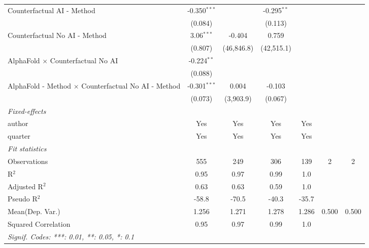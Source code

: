 \begin{tabular}{lcccccc}
   Counterfactual AI - Method                                 & -0.350$^{***}$ &              & -0.295$^{**}$ &                &     &   \\   
                                                              & (0.084)        &              & (0.113)       &                &     &   \\   
   Counterfactual No AI - Method                              & 3.06$^{***}$   & -0.404       & 0.759         &                &     &   \\   
                                                              & (0.807)        & (46,846.8)   & (42,515.1)    &                &     &   \\   
   AlphaFold $\times$ Counterfactual No AI                    & -0.224$^{**}$  &              &               &                &     &   \\   
                                                              & (0.088)        &              &               &                &     &   \\   
   AlphaFold - Method $\times$ Counterfactual No AI - Method  & -0.301$^{***}$ & 0.004        & -0.103        &                &     &   \\   
                                                              & (0.073)        & (3,903.9)    & (0.067)       &                &     &   \\   
   \midrule
   \emph{Fixed-effects}\\
   author                                                     & Yes            & Yes          & Yes           & Yes            &     & \\  
   quarter                                                    & Yes            & Yes          & Yes           & Yes            &     & \\  
   \midrule
   \emph{Fit statistics}\\
   Observations                                               & 555            & 249          & 306           & 139            & 2   & 2\\  
   R$^2$                                                      & 0.95           & 0.97         & 0.99          & 1.0            &     & \\  
   Adjusted R$^2$                                             & 0.63           & 0.63         & 0.59          & 1.0            &     & \\  
   Pseudo R$^2$                                               & -58.8          & -70.5        & -40.3         & -35.7          &     & \\  
Mean(Dep. Var.) & 1.256 & 1.271 & 1.278 & 1.286 & 0.500 & 0.500 \\
   Squared Correlation                                        & 0.95           & 0.97         & 0.99          & 1.0            &     & \\  
   \midrule \midrule
   \multicolumn{7}{l}{\emph{Signif. Codes: ***: 0.01, **: 0.05, *: 0.1}}\\
\end{tabular}
\par\endgroup
